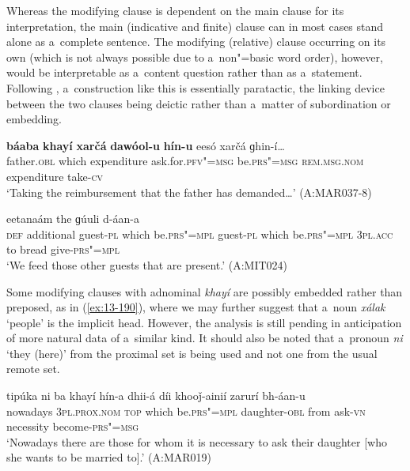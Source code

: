 Whereas the modifying clause is dependent on the main clause for its interpretation, the main (indicative and finite) clause can in most cases stand alone as a~complete sentence. The modifying (relative) clause occurring on its own (which is not always possible due to a~non"=basic word order), however, would be interpretable as a~content question rather than as a~statement. Following \citet[182]{givon2001b}, a~construction like this is essentially paratactic, the linking device between the two clauses being deictic rather than a~matter of subordination or embedding.

\begin{exe}
\ex
\label{ex:13-188}
\gll \textbf{báaba} \textbf{khayí} \textbf{xarčá} \textbf{dawóol-u} \textbf{hín-u}  eesó xarčá ɡhin-í{\ldots}  \\
father.\textsc{obl} which expenditure ask.for.\textsc{pfv"=msg} be.\textsc{prs"=msg} \textsc{rem.msg.nom} expenditure take-\textsc{cv} \\
\glt `Taking the reimbursement that the father has demanded{\ldots}' (A:MAR037-8)

\ex
\label{ex:13-189}
eetanaám the ɡúuli d-áan-a \\
\textsc{def} additional guest-\textsc{pl} which be.\textsc{prs"=mpl} guest-\textsc{pl} which be.\textsc{prs"=mpl} \textsc{3pl.acc} to bread give-\textsc{prs"=mpl} \\
\glt `We feed those other guests that are present.' (A:MIT024) 
\end{exe}

Some modifying clauses with adnominal \textit{khayí} are possibly embedded rather than preposed, as in (\ref{ex:13-190}), where we may further suggest that a~noun \textit{xálak} `people' is the implicit head. However, the analysis is still pending in anticipation of more natural data of a~similar kind. It should also be noted that a~pronoun \textit{ni} `they (here)' from the proximal set is being used and not one from the usual remote set.

\begin{exe}
\ex
\label{ex:13-190}
\gll tipúka ni ba khayí hín-a  dhii-á díi khooǰ-ainií zarurí bh-áan-u \\
nowadays \textsc{3pl.prox.nom} \textsc{top} which be.\textsc{prs"=mpl}  daughter-\textsc{obl} from ask-\textsc{vn} necessity become-\textsc{prs"=msg} \\
\glt `Nowadays there are those for whom it is necessary to ask their daughter [who she wants to be married to].' (A:MAR019) 
\end{exe}

